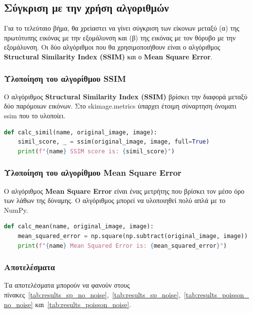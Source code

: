 \subsection{Σύγκριση με την χρήση αλγοριθμών}

Για το τελεύταιο βήμα, θα χρείαστει να γίνει σύγκριση των είκονων μεταξύ (α) της πρωτότυπης εικόνας με την εξομάλυνση και (β) της εικόνας με τον θόρυβο με την εξομάλυνση.
Οι δύο αλγόριθμοι που θα χρησιμοποιήθουν είναι ο αλγόριθμος \textbf{Structural Similarity Index (SSIM)} και ο \textbf{Mean Square Error}.

\subsubsection{Υλοποίηση του αλγορίθμου SSIM}

Ο αλγόριθμος \textbf{Structural Similarity Index (SSIM)} βρίσκει την διαφορά μεταξύ δύο παρόμοιων εικόνων. Στο skimage.metrics ύπαρχει έτοιμη σύναρτηση όνοματι ssim που το υλοποίει.

\begin{lstlisting}[language=Python, caption=SSIM Algorithm]
def calc_simil(name, original_image, image):
    simil_score, _ = ssim(original_image, image, full=True)
    print(f"{name} SSIM score is: {simil_score}")
\end{lstlisting}

\subsubsection{Υλοποίηση του αλγορίθμου Mean Square Error}

Ο αλγόριθμος \textbf{Mean Square Error} είναι ένας μετρήτης που βρίσκει τον μέσο όρο των λάθων της δύναμης. Ο αλγόριθμος μπορεί να υλοποιηθεί πολύ απλά με το NumPy.

\begin{lstlisting}[language=Python, caption=Mean Squared Error Algorithm]
def calc_mean(name, original_image, image):
    mean_squared_error = np.square(np.subtract(original_image, image)).mean()
    print(f"{name} Mean Squared Error is: {mean_squared_error}")
\end{lstlisting}

\newpage
\subsubsection{Αποτελέσματα}

Τα αποτελέσματα μπορούν να φανούν στους πίνακες~\ref{tab:results_sp_no_noise},~\ref{tab:results_sp_noise},~\ref{tab:results_poisson_no_noise} και~\ref{tab:results_poisson_noise}.

